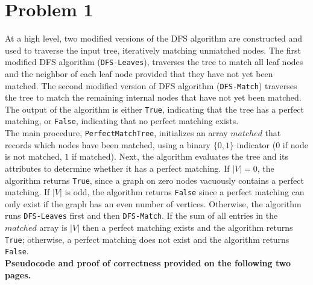 \documentclass[twoside,11pt]{homework}
\date{\today}
\begin{document}
\maketitle

\section*{Problem 1}
At a high level,  two modified versions of the DFS algorithm are constructed and used to traverse the input tree,  iteratively matching unmatched nodes.  The first modified DFS algorithm (\texttt{DFS-Leaves}),  traverses the tree to match all leaf nodes and the neighbor of each leaf node provided that they have not yet been matched.  The second modified version of DFS algorithm (\texttt{DFS-Match}) traverses the tree to match the remaining internal nodes that have not yet been matched.  The output of the algorithm is either \texttt{True}, indicating that the tree has a perfect matching, or \texttt{False},  indicating that no perfect matching exists.  \\

\noindent
The main procedure, \texttt{PerfectMatchTree}, initializes an array $matched$ that records which nodes have been matched, using a binary $\{0,1\}$ indicator ($0$ if node is not matched, $1$ if matched).  Next, the algorithm evaluates the tree and its attributes to determine whether it has a perfect matching.  If $|V| = 0$, the algorithm returns \texttt{True}, since a graph on zero nodes vacuously contains a perfect matching.  If $|V|$ is odd, the algorithm returns \texttt{False} since a perfect matching can only exist if the graph has an even number of vertices.  Otherwise, the algorithm runs \texttt{DFS-Leaves} first and then \texttt{DFS-Match}.  If the sum of all entries in the $matched$ array is $|V|$ then a perfect matching exists and the algorithm returns \texttt{True}; otherwise, a perfect matching does not exist and the algorithm returns \texttt{False}.   \\

\noindent
\textbf{Pseudocode and proof of correctness provided on the following two pages. }\\ 

\end{document}
